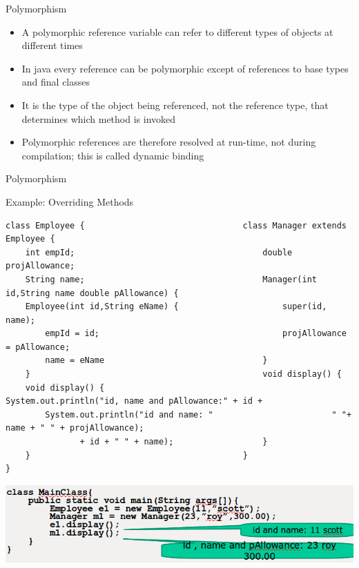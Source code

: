 \documentclass[14pt]{beamer}
\begin{document}
\begin{frame}{Polymorphism}
 \begin{itemize}
  \item A polymorphic reference variable can refer to different types of objects at different times
  \item In java every reference can be polymorphic except of references to base types and final classes
  \item It is the type of the object being referenced, not the reference type, that determines which method is invoked
  \item Polymorphic references are therefore resolved at run-time, not during compilation; this is called dynamic binding
   \end{itemize}

\end{frame}

\begin{frame}[fragile]{Polymorphism}
 \begin{block}{Example: Overriding Methods }
\begin{lstlisting}[numbers=none, basicstyle=\tiny]
class Employee {                                class Manager extends Employee {
    int empId;                                      double projAllowance;
    String name;                                    Manager(int id,String name double pAllowance) {
    Employee(int id,String eName) {                     super(id, name);
        empId = id;                                     projAllowance = pAllowance;
        name = eName                                }
    }                                               void display() {
    void display() {                                    System.out.println("id, name and pAllowance:" + id +
        System.out.println("id and name: "                        " "+ name + " " + projAllowance);
               + id + " " + name);                  }
    }                                           }
}
  \end{lstlisting}
\includegraphics[scale=.42]{overriding-main-class.png}
 \end{block}
\end{frame}
\end{document}
